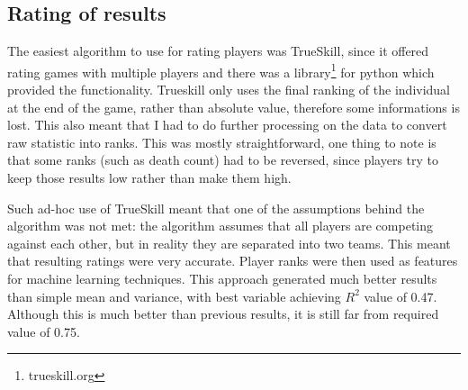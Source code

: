 \documentclass[12pt,a4paper]{book}
\begin{document}
\subsection{Rating of results}
The easiest algorithm to use for rating players was TrueSkill, since it offered rating games with multiple players and there was a library\footnote{trueskill.org} for python which provided the functionality.
Trueskill only uses the final ranking of the individual at the end of the game, rather than absolute value, therefore some informations is lost.
This also meant that I had to do further processing on the data to convert raw statistic into ranks.
This was mostly straightforward, one thing to note is that some ranks (such as death count) had to be reversed, since players try to keep those results low rather than make them high.

Such ad-hoc use of TrueSkill meant that one of the assumptions behind the algorithm was not met:
the algorithm assumes that all players are competing against each other, but in reality they are separated into two teams.
This meant that resulting ratings were very accurate.
Player ranks were then used as features for machine learning techniques.
This approach generated much better results than simple mean and variance, with best variable achieving $R^2$ value of 0.47.
Although this is much better than previous results, it is still far from required value of 0.75.
\end{document}
